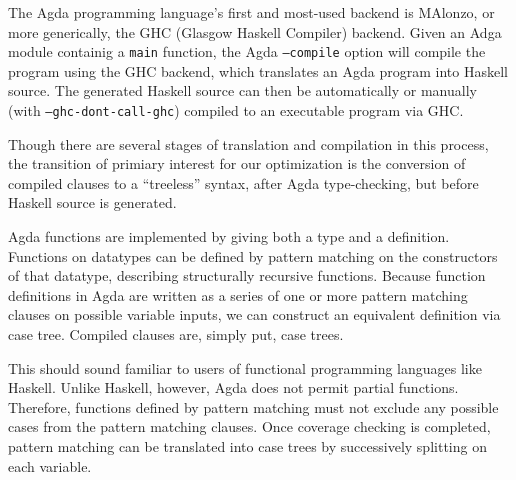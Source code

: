The Agda programming language's first and most-used backend is MAlonzo, or more generically, the GHC (Glasgow Haskell Compiler) backend.\cite{benke2007} Given an Adga module containig a \lstinline{main} function, the Agda \texttt{--compile} option will compile the program using the GHC backend, which translates an Agda program into Haskell source. The generated Haskell source can then be automatically or manually (with \texttt{--ghc-dont-call-ghc}) compiled to an executable program via GHC.\cite{agdadocs} %

Though there are several stages of translation and compilation in this process, the transition of primiary interest for our optimization is the conversion of compiled clauses to a ``treeless'' syntax, after Agda type-checking, but before Haskell source is generated.

Agda functions are implemented by giving both a type and a definition. Functions on datatypes can be defined by pattern matching on the constructors of that datatype, describing structurally recursive functions.\cite{agdawiki} %
Because function definitions in Agda are written as a series of one or more pattern matching clauses on possible variable inputs, we can construct an equivalent definition via case tree.\cite{agdawiki} %
Compiled clauses are, simply put, case trees.

This should sound familiar to users of functional programming languages like Haskell. Unlike Haskell, however, Agda does not permit partial functions. Therefore, functions defined by pattern matching must not exclude any possible cases from the pattern matching clauses.\cite{agdawiki} %
Once coverage checking is completed, pattern matching can be translated into case trees by successively splitting on each variable.\cite{agdahackage} %



